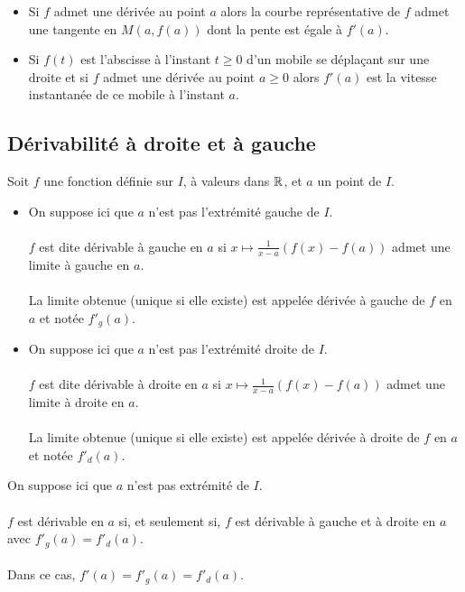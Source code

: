 \begin{defprop}
	\begin{itemize}
		\item  Si \(f\) admet une dérivée au point \(a\) alors la courbe représentative de \(f\) admet une tangente en  \(M (a, f (a))\) dont la pente est égale à \(f '(a)\).
		\item Si \(f (t)\) est l’abscisse à l’instant \(t \geq 0\) d’un mobile se déplaçant sur une droite et si \(f\) admet une dérivée au point \(a \geq 0\) alors \(f '(a)\) est la vitesse instantanée de ce mobile à l’instant \(a\).
	\end{itemize}
\end{defprop}

\subsection{Dérivabilité à droite et à gauche}
Soit \(f\) une fonction définie sur \(I\), à valeurs dans \(\mathbb{R}\), et \(a\) un point de \(I\).
\begin{defi}
	\begin{itemize}
		\item On suppose ici que \(a\) n’est pas l’extrémité gauche de \(I\).\\~\\
		      \(f\) est dite dérivable à gauche en \(a\) si \(x \mapsto \frac{1}{ x - a} (f (x) - f (a))\) admet une limite à gauche en \(a\).\\~\\
		      La limite obtenue (unique si elle existe) est appelée dérivée à gauche de \(f\) en \(a\) et notée \(f '_g(a)\).
		\item On suppose ici que \(a\) n’est pas l’extrémité droite de \(I\).\\~\\
		      \(f\) est dite dérivable à droite en \(a\) si \(x \mapsto \frac{1}{x - a} (f (x) - f (a))\) admet une limite à droite en \(a\).\\~\\
		      La limite obtenue (unique si elle existe) est appelée dérivée à droite de \(f\) en \(a\) et notée \(f '_d(a)\).
	\end{itemize}
\end{defi}

\begin{prop}
	On suppose ici que \(a\) n’est pas extrémité de \(I\).\\~\\
	\(f\) est dérivable en \(a\) si, et seulement si, \(f\) est dérivable à gauche et à droite en \(a\) avec \(f '_g(a) = f '_d(a)\).\\~\\
	Dans ce cas, \(f '(a) = f '_g(a) = f '_d(a)\).
\end{prop}

